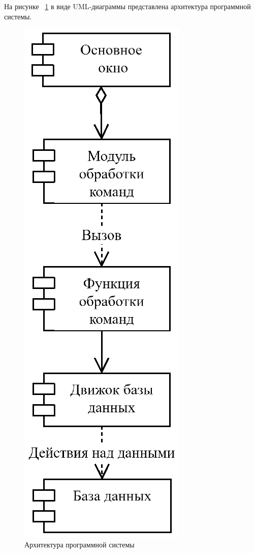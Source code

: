 На рисунке ~\ref{fig:arch} в виде UML-диаграммы представлена архитектура программной системы.
\begin{figure}[H]
	\centering
	\includegraphics[width=1\linewidth]{images/svg_arch}
	\caption{Архитектура программной системы}
	\label{fig:arch}
\end{figure}

